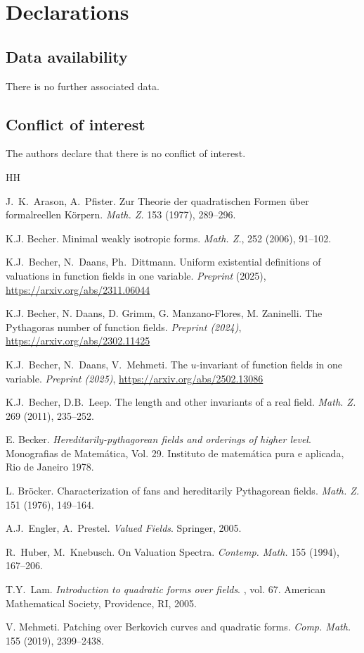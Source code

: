 \documentclass[twoside,11pt]{amsart}
\numberwithin{equation}{section}
\theoremstyle{definition}
\begin{document}
\section*{Declarations}

\subsection*{Data availability}
There is no further associated data.

\subsection*{Conflict of interest} The authors declare that there is no conflict of interest.



\begin{thebibliography}{HH}

 J.~K.~Arason, A.~Pfister.
Zur Theorie der quadratischen Formen über formalreellen Körpern.
\emph{Math. Z.} 153 (1977), 289--296.

 K.J. Becher. Minimal weakly isotropic forms. \emph{Math. Z.}, 252 (2006), 91--102.

K.J.~Becher, N.~Daans, Ph.~Dittmann. 
Uniform existential definitions of valuations in function fields in one variable.
\emph{Preprint} (2025), \url{https://arxiv.org/abs/2311.06044}

 K.J. Becher, N. Daans, D. Grimm, G. Manzano-Flores, M. Zaninelli.
{The Pythagoras number of function fields}.
\emph{Preprint (2024)},
 \url{https://arxiv.org/abs/2302.11425}

K.J.~Becher, N.~Daans, V.~Mehmeti. The $u$-invariant of function fields in one variable. 
\emph{Preprint (2025)},
\url{https://arxiv.org/abs/2502.13086}

K.J.~Becher, D.B.~Leep.
The length and other invariants of a real field.
\emph{Math. Z.} 269 (2011), 235--252.

E. Becker. \emph{Hereditarily-pythagorean fields and orderings of higher level}. Monografias de
Matem\'atica, Vol. 29. Instituto de matem\'atica pura e aplicada, Rio de Janeiro 1978.

 L. Br\"ocker. Characterization of fans and hereditarily Pythagorean fields. 
\emph{Math. Z.} 151
(1976), 149--164.

A.J.~Engler, A.~Prestel. \emph{Valued Fields}. Springer, 2005.

R.~Huber, M.~Knebusch. On Valuation Spectra. 
\emph{Contemp. Math.} 155 (1994), 167--206.

 T.Y.~Lam. \newblock \emph{Introduction to quadratic forms over fields}. , vol. 67. American Mathematical Society, Providence, RI, 2005.

V. Mehmeti. Patching over Berkovich curves and quadratic forms. \emph{Comp. Math.} 155 (2019), 2399--2438.

\end{thebibliography}
\end{document}
